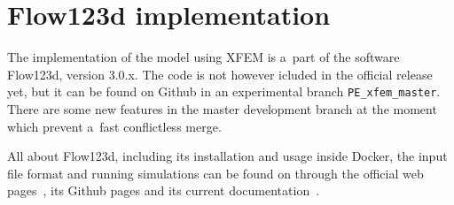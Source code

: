 

\section{Flow123d implementation}

The implementation of the model using XFEM is a~part of the software Flow123d, version 3.0.x.
The code is not however icluded in the official release yet, but it can be found on Github in an experimental branch \verb'PE_xfem_master'.
There are some new features in the master development branch at the moment which prevent a~fast conflictless merge.

All about Flow123d, including its installation and usage inside Docker, the input file format and running simulations
can be found on through the official web pages~\cite{flow123d}, its Github pages and its current documentation~\cite{flow123d_doc_2018}.

